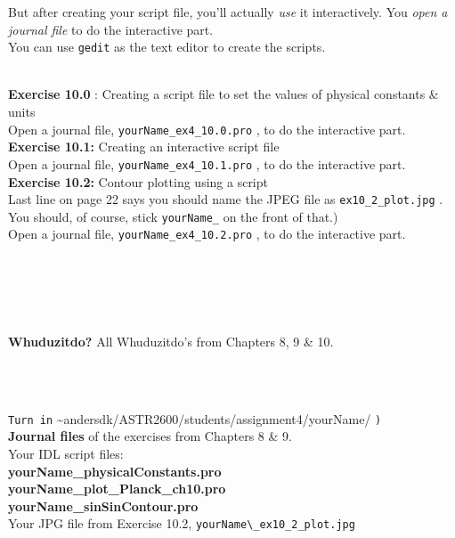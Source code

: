 \documentclass{article}
\begin{document}
\begin{spacing}{1.0}
  But after creating your script file, you’ll actually  \emph{use}  it interactively.   You  \emph{open a journal file}  to do the interactive part. \\ 
  You can use  \verb|gedit|  as the text editor to create the scripts. \\ 
  \par \\ 
  \textbf{Exercise 10.0} : Creating a script file to set the values of physical constants \& units \\ 
  Open a journal file,  \verb|yourName_ex4_10.0.pro| , to do the interactive part. \\ 
  \textbf{Exercise 10.1:}  Creating an interactive script file \\ 
  Open a journal file,  \verb|yourName_ex4_10.1.pro| , to do the interactive part. \\ 
  \textbf{Exercise 10.2:}  Contour plotting using a script \\ 
  Last line on page 22 says you should name the JPEG file as  \verb|ex10_2_plot.jpg| .   You should, of course, stick  \verb|yourName_|  on the front of that.) \\ 
  Open a journal file,  \verb|yourName_ex4_10.2.pro| , to do the interactive part. \\ 
  \par \\ 
  \par \\ 
  \par \\ 
  \textbf{Whuduzitdo?}   All Whuduzitdo’s from Chapters 8, 9 \& 10. \\ 
  \par \\ 
  \par \\ 
  \verb|Turn in| \textasciitilde{}andersdk/ASTR2600/students/assignment4/yourName/ \verb|)| \\ 
  \textbf{Journal files}  of the exercises from Chapters 8 \& 9. \\ 
  Your IDL script files:   \\ 
  \textbf{yourName\_physicalConstants.pro} \\ 
  \textbf{yourName\_plot\_Planck\_ch10.pro} \\ 
  \textbf{yourName\_sinSinContour.pro} \\ 
  Your JPG file from Exercise 10.2,  \verb|yourName\_ex10_2_plot.jpg| \\ 
  \par \\ 

\end{spacing}
\end{document}
